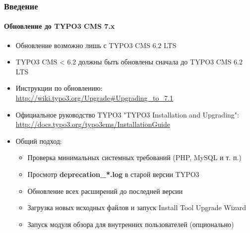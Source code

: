 \begin{frame}[fragile]
	\frametitle{Введение}
	\framesubtitle{Обновление до TYPO3  CMS 7.x}

	\begin{itemize}
		\item Обновление возможно лишь с TYPO3 CMS 6.2 LTS
		\item TYPO3 CMS < 6.2 должны быть обновлены сначала до TYPO3 CMS 6.2 LTS
		\item Инструкции по обновлению:\newline
			\smaller\url{http://wiki.typo3.org/Upgrade#Upgrading_to_7.1}\normalsize
		\item Официальное руководство TYPO3 "TYPO3 Installation and Upgrading":
			\smaller\url{http://docs.typo3.org/typo3cms/InstallationGuide}\normalsize
		\item Общий подход:
			\begin{itemize}
				\item Проверка минимальных системных требований \small(PHP, MySQL и т. п.)
				\item Просмотр \textbf{deprecation\_*.log} в старой версии TYPO3
				\item Обновление всех расширений до последней версии
				\item Загрузка новых исходных файлов и запуск Install Tool \textrightarrow Upgrade Wizard
				\item Запуск модуля обзора для внутренних пользователей (опционально)
			\end{itemize}
	\end{itemize}

\end{frame}


